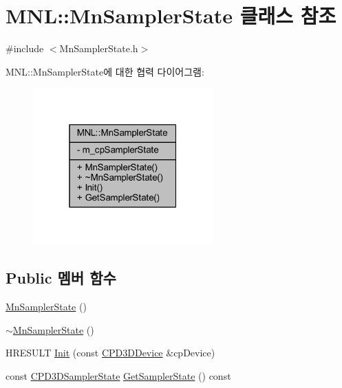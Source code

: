 \hypertarget{class_m_n_l_1_1_mn_sampler_state}{}\section{M\+NL\+:\+:Mn\+Sampler\+State 클래스 참조}
\label{class_m_n_l_1_1_mn_sampler_state}


{\ttfamily \#include $<$Mn\+Sampler\+State.\+h$>$}



M\+NL\+:\+:Mn\+Sampler\+State에 대한 협력 다이어그램\+:\nopagebreak
\begin{figure}[H]
\begin{center}
\leavevmode
\includegraphics[width=196pt]{class_m_n_l_1_1_mn_sampler_state__coll__graph}
\end{center}
\end{figure}
\subsection*{Public 멤버 함수}
\begin{DoxyCompactItemize}
\item 
\hyperlink{class_m_n_l_1_1_mn_sampler_state_a91fd21a75e70068eb6ca7c6e7e9f4d97}{Mn\+Sampler\+State} ()
\item 
\hyperlink{class_m_n_l_1_1_mn_sampler_state_aecb465a7b7c0e81aee3c10dbe1ed8164}{$\sim$\+Mn\+Sampler\+State} ()
\item 
H\+R\+E\+S\+U\+LT \hyperlink{class_m_n_l_1_1_mn_sampler_state_abef27e0e5a06502b2b15d0f96da13ef6}{Init} (const \hyperlink{namespace_m_n_l_a1eec210db8f309a4a9ac0d9658784c31}{C\+P\+D3\+D\+Device} \&cp\+Device)
\item 
const \hyperlink{namespace_m_n_l_ae0141196161ecb3d3055523077ca3aa1}{C\+P\+D3\+D\+Sampler\+State} \hyperlink{class_m_n_l_1_1_mn_sampler_state_a04ae5109c39ea08d8553c50387793558}{Get\+Sampler\+State} () const
\end{DoxyCompactItemize}
